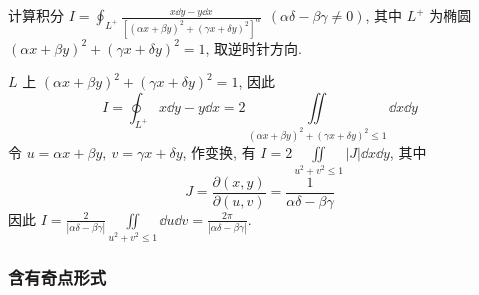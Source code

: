 \begin{example}
    计算积分 $\displaystyle I=\oint_{L^+}\frac{x\dd y-y\dd x}{[(\alpha x+\beta y)^2+(\gamma x+\delta y)^2]^\alpha}~~(\alpha\delta-\beta\gamma\not=0)$, 其中 $L^+$ 为椭圆 $(\alpha x+\beta y)^2+(\gamma x+\delta y)^2=1$, 取逆时针方向.
\end{example}
\begin{solution}
    $L$ 上 $(\alpha x+\beta y)^2+(\gamma x+\delta y)^2=1$, 因此
    $$\displaystyle I=\oint_{L^+}x\dd y-y\dd x=2\iint\limits_{(\alpha x+\beta y)^2+(\gamma x+\delta y)^2\leqslant  1}\dd x\dd y$$
    令 $u=\alpha x+\beta y,~v=\gamma x+\delta y$, 作变换, 有 $\displaystyle I=2\iint\limits_{u^2+v^2\leqslant  1}|J|\dd x\dd y$, 其中
    $$J=\frac{\partial (x,y)}{\partial (u,v)}=\frac{1}{\alpha\delta-\beta\gamma}$$
    因此 $\displaystyle I=\frac{2}{|\alpha\delta-\beta\gamma|}\iint\limits_{u^2+v^2\leqslant  1}\dd u\dd v=\frac{2\pi}{|\alpha\delta-\beta\gamma|}.$
\end{solution}

\subsubsection{含有奇点形式}

